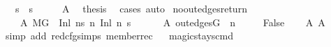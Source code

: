 \begin{isabellebody}
\ \ \ {\isachardoublequoteopen}s\ {\isacharequal}{\kern0pt}\ s{\isacharprime}{\kern0pt}{\isacharprime}{\kern0pt}{\isachardoublequoteclose}\isanewline
%
\isadelimproof
%
\endisadelimproof
%
\isatagproof
{}\isamarkupfalse%
\ {\isacharminus}{\kern0pt}\isanewline
\ \ \isamarkupfalse%
\ A{}\ \isamarkupfalse%
\ {\isacharquery}{\kern0pt}thesis\ \isamarkupfalse%
\ {\isacharparenleft}{\kern0pt}cases{\isacharsemicolon}{\kern0pt}\ auto{\isacharparenright}{\kern0pt}\isanewline
{}\isamarkupfalse%
%
\endisatagproof
{\isafoldproof}%
%
\isadelimproof
\isanewline
%
\endisadelimproof
\isanewline
{}\isamarkupfalse%
\ no{\isacharunderscore}{\kern0pt}out{\isacharunderscore}{\kern0pt}edges{\isacharunderscore}{\kern0pt}return{\isacharcolon}{\kern0pt}\isanewline
\ \ \ \isanewline
\ \ \ \ A{}{\isacharcolon}{\kern0pt}\ {\isachardoublequoteopen}M{\isacharcomma}{\kern0pt}{\isasymLambda}{\isacharcomma}{\kern0pt}{\isasymGamma}{\isacharcomma}{\kern0pt}{\isasymOmega}{\isacharcomma}{\kern0pt}G\ {\isasymturnstile}\ {\isacharparenleft}{\kern0pt}Inl\ n{\isacharcomma}{\kern0pt}s{\isacharparenright}{\kern0pt}\ {\isacharminus}{\kern0pt}n{\isasymrightarrow}\ {\isacharparenleft}{\kern0pt}Inl\ n{\isacharprime}{\kern0pt}{\isacharcomma}{\kern0pt}\ s{\isacharprime}{\kern0pt}{\isacharparenright}{\kern0pt}{\isachardoublequoteclose}\ \ \isanewline
\ \ \ \ A{}{\isacharcolon}{\kern0pt}\ {\isachardoublequoteopen}{\isacharparenleft}{\kern0pt}out{\isacharunderscore}{\kern0pt}edges{\isacharparenleft}{\kern0pt}G{\isacharparenright}{\kern0pt}\ {\isacharbang}{\kern0pt}\ n{\isacharparenright}{\kern0pt}\ {\isacharequal}{\kern0pt}\ {\isacharbrackleft}{\kern0pt}{\isacharbrackright}{\kern0pt}{\isachardoublequoteclose}\isanewline
\ \ \ False\isanewline
%
\isadelimproof
\ \ %
\endisadelimproof
%
\isatagproof
{}\isamarkupfalse%
\ A{}\ A{}\ \isanewline
\ \ \isamarkupfalse%
\ {\isacharparenleft}{\kern0pt}simp\ add{\isacharcolon}{\kern0pt}\ red{\isacharunderscore}{\kern0pt}cfg{\isachardot}{\kern0pt}simps\ member{\isacharunderscore}{\kern0pt}rec{\isacharparenleft}{\kern0pt}{}{\isacharparenright}{\kern0pt}{\isacharparenright}{\kern0pt}%
\endisatagproof
{\isafoldproof}%
%
\isadelimproof
\ \isanewline
%
\endisadelimproof
\isanewline
{}\isamarkupfalse%
\ magic{\isacharunderscore}{\kern0pt}stays{\isacharunderscore}{\kern0pt}cmd{\isacharcolon}{\kern0pt}\isanewline

\end{isabellebody}
